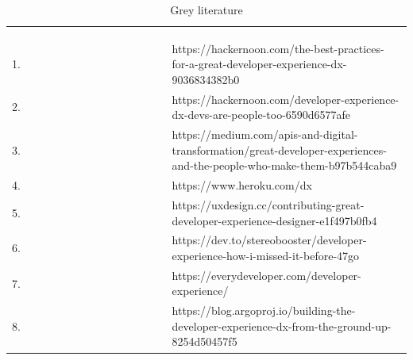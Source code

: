 \documentclass[english, 12pt, a4paper, sci, utf8, a-1b, online]{aaltothesis}
\begin{document}
\begin{center}
  \begin{longtable}{p{0.05\linewidth}p{0.35\linewidth}p{0.60\linewidth}}
    \captionsetup{width=0.6\textwidth}                                                                                                                                                               \\
    \caption{Grey literature}                                                                                                                                                                        \\
    \label{table:grey-literature}                                                                                                                                                                    \\
    1.  & \textcite{the-best-practices-for-a-great-dx}                    & https://hackernoon.com/the-best-practices-for-a-great-developer-experience-dx-9036834382b0                               \\
    2.  & \textcite{dx-devs-are-people-too}                               & https://hackernoon.com/developer-experience-dx-devs-are-people-too-6590d6577afe                                          \\
    3.  & \textcite{great-dx-and-the-people-who-make-them}                & https://medium.com/apis-and-digital-transformation/great-developer-experiences-and-the-people-who-make-them-b97b544caba9 \\
    4.  & \textcite{heroku-dx}                                            & https://www.heroku.com/dx                                                                                                \\
    5.  & \textcite{contributing-as-a-designer}                           & https://uxdesign.cc/contributing-great-developer-experience-designer-e1f497b0fb4                                         \\
    6.  & \textcite{how-i-missed-it-before}                               & https://dev.to/stereobooster/developer-experience-how-i-missed-it-before-47go                                            \\
    7.  & \textcite{what-is-developer-experience-everydeveloper}          & https://everydeveloper.com/developer-experience/                                                                         \\
    8.  & \textcite{building-the-developer-experience-from-the-ground-up} & https://blog.argoproj.io/building-the-developer-experience-dx-from-the-ground-up-8254d50457f5                            \\

\end{longtable}
\end{center}
\end{document}
